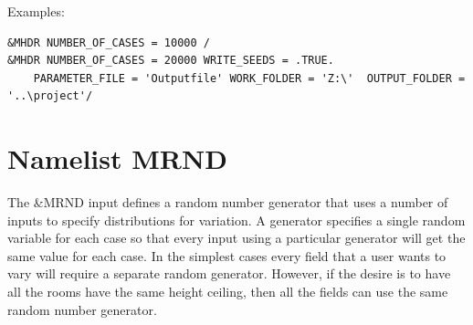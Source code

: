 \documentclass[12pt,twoside]{book}
\begin{document}
\vspace{\baselineskip}
\noindent Examples:
\begin{lstlisting}
&MHDR NUMBER_OF_CASES = 10000 /
&MHDR NUMBER_OF_CASES = 20000 WRITE_SEEDS = .TRUE.
	PARAMETER_FILE = 'Outputfile' WORK_FOLDER = 'Z:\'  OUTPUT_FOLDER = '..\project'/
\end{lstlisting}



\section{Namelist MRND}
\label{info:MRND}

The {\ct \&MRND} input defines a random number generator that uses a number of inputs to specify distributions for variation. A generator specifies a single random variable for each case so that every input using a particular generator will get the same value for each case. In the simplest cases every field that a user wants to vary will require a separate random generator. However, if the desire is to have all the rooms have the same height ceiling, then all the fields can use the same random number generator.
\end{document}
